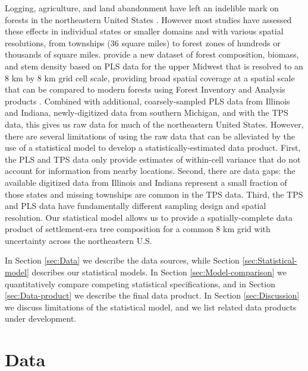 \documentclass[12pt]{article}
\begin{document}
Logging, agriculture, and land abandonment have left an indelible
mark on forests in the northeastern United States \citep{foster1998land,rhemtulla2009legacies,thompson2013four,goring2015composition}.
However most studies have assessed these effects in individual states
or smaller domains \citep{friedman2005regional,rhemtulla2009historical}
and with various spatial resolutions, from townships (36 square miles)
to forest zones of hundreds or thousands of square miles. \citet{goring2015composition}
provide a new dataset of forest composition, biomass, and stem density
based on PLS data for the upper Midwest that is resolved to an 8 km
by 8 km grid cell scale, providing broad spatial coverage at a spatial
scale that can be compared to modern forests using Forest Inventory
and Analysis products \citep{gray2012forest}. Combined with additional,
coarsely-sampled PLS data from Illinois and Indiana, newly-digitized
data from southern Michigan, and with the TPS data, this gives us
raw data for much of the northeastern United States. However, there
are several limitations of using the raw data that can be alleviated
by the use of a statistical model to develop a statistically-estimated
data product. First, the PLS and TPS data only provide estimates of
within-cell variance that do not account for information from nearby
locations. Second, there are data gaps: the available digitized data
from Illinois and Indiana represent a small fraction of those states
and missing townships are common in the TPS data. Third, the TPS and
PLS data have fundamentally different sampling design and spatial
resolution. Our statistical model allows us to provide a spatially-complete
data product of settlement-era tree composition for a common 8 km
grid with uncertainty across the northeastern U.S.

In Section \ref{sec:Data} we describe the data sources, while Section
\ref{sec:Statistical-model} describes our statistical models. In
Section \ref{sec:Model-comparison} we quantitatively compare competing
statistical specifications, and in Section \ref{sec:Data-product}
we describe the final data product. In Section \ref{sec:Discussion}
we discuss limitations of the statistical model, and we list related
data products under development.




\section{Data\label{sec:Data}}
\end{document}
